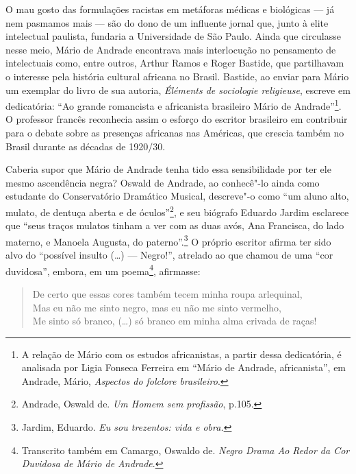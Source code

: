 O mau gosto das formulações racistas em metáforas médicas e biológicas
--- já nem pasmamos mais --- são do dono de um influente jornal que, junto
à elite intelectual paulista, fundaria a Universidade de São Paulo.
Ainda que circulasse nesse meio, Mário de Andrade encontrava mais
interlocução no pensamento de intelectuais como, entre outros, Arthur
Ramos e Roger Bastide, que partilhavam o interesse pela história
cultural africana no Brasil. Bastide, ao enviar para Mário um exemplar
do livro de sua autoria, \emph{Éléments de sociologie religieuse},
escreve em dedicatória: ``Ao grande romancista e africanista brasileiro
Mário de Andrade''\footnote{A relação de Mário com os estudos
  africanistas, a partir dessa dedicatória, é analisada por Ligia
  Fonseca Ferreira em ``Mário de Andrade, africanista'', em Andrade,
  Mário, \emph{Aspectos do folclore brasileiro}.}. O professor francês
reconhecia assim o esforço do escritor brasileiro em contribuir para o
debate sobre as presenças africanas nas Américas, que crescia também no
Brasil durante as décadas de 1920/30.

Caberia supor que Mário de Andrade tenha tido essa sensibilidade por ter
ele mesmo ascendência negra? Oswald de Andrade, ao conhecê"-lo ainda como
estudante do Conservatório Dramático Musical, descreve"-o como ``um aluno
alto, mulato, de dentuça aberta e de óculos''\footnote{Andrade, Oswald
  de. \emph{Um Homem sem profissão}, p.105.}, e seu biógrafo Eduardo
Jardim esclarece que ``seus traços mulatos tinham a ver com as duas
avós, Ana Francisca, do lado materno, e Manoela Augusta, do
paterno''.\footnote{Jardim, Eduardo. \emph{Eu sou trezentos: vida e
  obra.}} O próprio escritor afirma ter sido alvo do ``possível insulto
(\ldots{}) --- Negro!'', atrelado ao que chamou de uma ``cor duvidosa'',
embora, em um poema\footnote{Transcrito também em Camargo, Oswaldo de.
  \emph{Negro Drama Ao Redor da Cor Duvidosa de Mário de Andrade}.},
afirmasse:

\begin{verse}
De certo que essas cores também tecem minha \qb{}roupa arlequinal,\\
Mas eu não me sinto negro, mas eu não me \qb{}sinto vermelho,\\
Me sinto só branco, (\ldots{}) só branco em minha \qb{}alma crivada de raças!
\end{verse}

